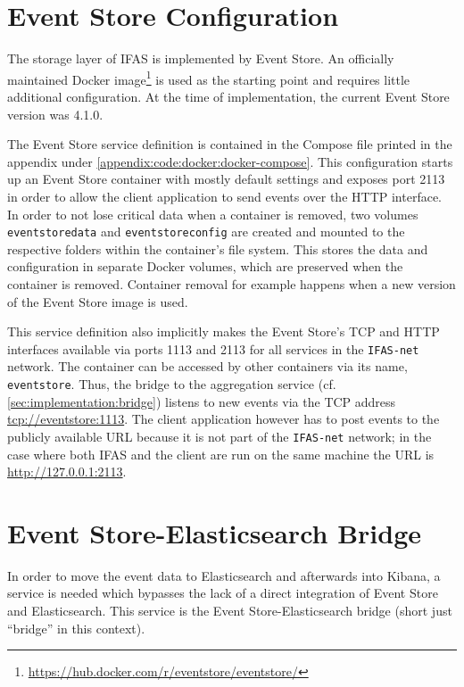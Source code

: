 \section{Event Store Configuration}
\label{sec:implementation:storage}

The storage layer of \ac{IFAS} is implemented by Event Store.
An officially maintained Docker image\footnote{\url{https://hub.docker.com/r/eventstore/eventstore/}} is used as the starting point and requires little additional configuration.
At the time of implementation, the current Event Store version was 4.1.0.

The Event Store service definition is contained in the Compose file printed in the appendix under \cref{appendix:code:docker:docker-compose}.
This configuration starts up an Event Store container with mostly default settings and exposes port 2113 in order to allow the client application to send events over the \ac{HTTP} interface.
In order to not lose critical data when a container is removed, two volumes \texttt{eventstoredata} and \texttt{eventstoreconfig} are created and mounted to the respective folders within the container's file system.
This stores the data and configuration in separate Docker volumes, which are preserved when the container is removed.
Container removal for example happens when a new version of the Event Store image is used.

This service definition also implicitly makes the Event Store's \ac{TCP} and \ac{HTTP} interfaces available via ports 1113 and 2113 for all services in the \texttt{IFAS-net} network.
The container can be accessed by other containers via its name, \texttt{eventstore}.
Thus, the bridge to the aggregation service (cf. \cref{sec:implementation:bridge}) listens to new events via the \ac{TCP} address \url{tcp://eventstore:1113}.
The client application however has to post events to the publicly available URL because it is not part of the \texttt{IFAS-net} network; in the case where both \ac{IFAS} and the client are run on the same machine the URL is \url{http://127.0.0.1:2113}.

\section{Event Store-Elasticsearch Bridge}
\label{sec:design:bridge}
\label{sec:implementation:bridge}

In order to move the event data to Elasticsearch and afterwards into Kibana, a service is needed which bypasses the lack of a direct integration of Event Store and Elasticsearch.
This service is the Event Store-Elasticsearch bridge (short just ``bridge'' in this context).


